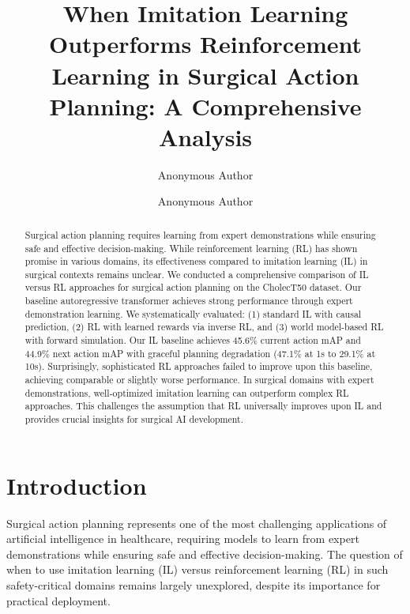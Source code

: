 \documentclass[runningheads]{llncs}
\begin{document}
\title{When Imitation Learning Outperforms Reinforcement Learning in Surgical Action Planning: A Comprehensive Analysis}

\author{Anonymous Author \and
Anonymous Author}



\maketitle


\begin{abstract}
Surgical action planning requires learning from expert demonstrations while ensuring safe and effective decision-making. While reinforcement learning (RL) has shown promise in various domains, its effectiveness compared to imitation learning (IL) in surgical contexts remains unclear. We conducted a comprehensive comparison of IL versus RL approaches for surgical action planning on the CholecT50 dataset. Our baseline autoregressive transformer achieves strong performance through expert demonstration learning. We systematically evaluated: (1) standard IL with causal prediction, (2) RL with learned rewards via inverse RL, and (3) world model-based RL with forward simulation. Our IL baseline achieves 45.6\% current action mAP and 44.9\% next action mAP with graceful planning degradation (47.1\% at 1s to 29.1\% at 10s). Surprisingly, sophisticated RL approaches failed to improve upon this baseline, achieving comparable or slightly worse performance. In surgical domains with expert demonstrations, well-optimized imitation learning can outperform complex RL approaches. This challenges the assumption that RL universally improves upon IL and provides crucial insights for surgical AI development.

\end{abstract}


\section{Introduction}

Surgical action planning represents one of the most challenging applications of artificial intelligence in healthcare, requiring models to learn from expert demonstrations while ensuring safe and effective decision-making. The question of when to use imitation learning (IL) versus reinforcement learning (RL) in such safety-critical domains remains largely unexplored, despite its importance for practical deployment.
\end{document}
